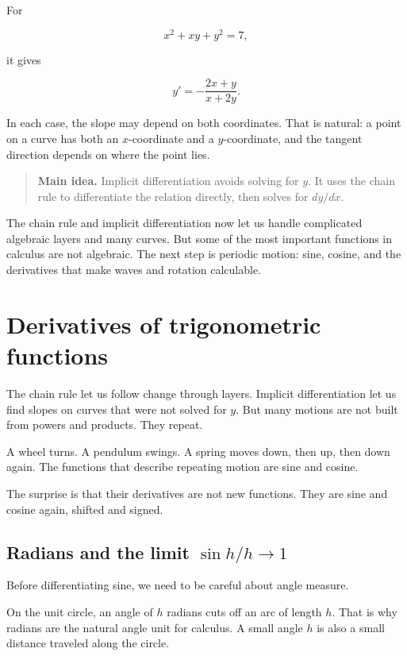 For

\[
x^2+xy+y^2=7,
\]

it gives

\[
y'=-\frac{2x+y}{x+2y}.
\]

In each case, the slope may depend on both coordinates.  That is natural: a point on a curve has both an \(x\)-coordinate and a \(y\)-coordinate, and the tangent direction depends on where the point lies.

\begin{quote}
\textbf{Main idea.}
Implicit differentiation avoids solving for \(y\).  It uses the chain rule to differentiate the relation directly, then solves for \(dy/dx\).
\end{quote}

The chain rule and implicit differentiation now let us handle complicated algebraic layers and many curves.  But some of the most important functions in calculus are not algebraic.  The next step is periodic motion: sine, cosine, and the derivatives that make waves and rotation calculable.
\section{Derivatives of trigonometric functions}
\label{sec:derivatives-trigonometric-functions}

The chain rule let us follow change through layers.  Implicit differentiation let us find slopes on curves that were not solved for \(y\).  But many motions are not built from powers and products.  They repeat.

A wheel turns.  A pendulum swings.  A spring moves down, then up, then down again.  The functions that describe repeating motion are sine and cosine.

The surprise is that their derivatives are not new functions.  They are sine and cosine again, shifted and signed.

\subsection{Radians and the limit \texorpdfstring{\(\sin h/h\to1\)}{sin h over h tends to 1}}
\label{subsec:radians-sin-h-over-h}

Before differentiating sine, we need to be careful about angle measure.

On the unit circle, an angle of \(h\) radians cuts off an arc of length \(h\).  That is why radians are the natural angle unit for calculus.  A small angle \(h\) is also a small distance traveled along the circle.

